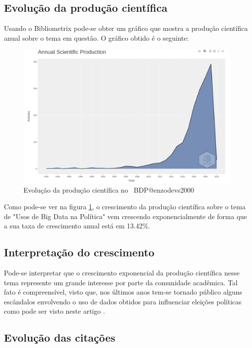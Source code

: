 \subsection{Evolução da produção científica}

Usando o Bibliometrix pode-se obter um gráfico que mostra a produção científica anual sobre o tema em questão. O gráfico obtido é o seguinte:

\begin{figure}
    \centering
    \includegraphics[width=1\textwidth]{experiments/enzodevs2000/AnaliseBibliometrica/BigDataInPolicy/Graficos/evolution.png}
    \caption{Evolução da produção científica no \dataset\   BDP@enzodevs2000}
    \label{fig:enzodevs2000:BDP:evol}
\end{figure}

Como pode-se ver na figura \ref{fig:enzodevs2000:BDP:evol}, o crescimento da produção científica sobre o tema de "Usos de Big Data na Política" vem crescendo exponencialmente de forma que a sua taxa de crescimento anual está em 13.42\%.

\subsection{Interpretação do crescimento}

Pode-se interpretar que o crescimento exponencial da produção científica nesse tema represente um grande interesse por parte da comunidade acadêmica. Tal fato é compreensível, visto que, nos últimos anos tem-se tornado público alguns escândalos envolvendo o uso de dados obtidos para influenciar eleições políticas como pode ser visto neste artigo \citet{wikipedia_escandalo_nodate}.

\subsection{Evolução das citações}

